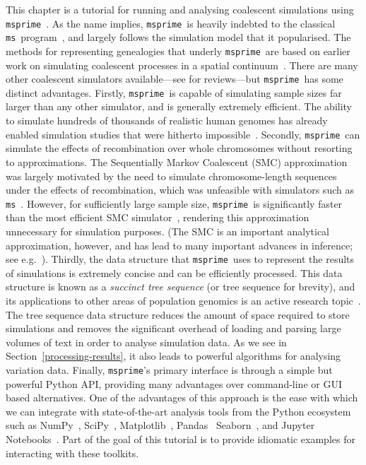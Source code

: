 \documentclass[graybox]{svmult}
\newcommand{\msprime}[0]{\texttt{msprime}}
\newcommand{\ms}[0]{\texttt{ms}}
\begin{document}
This chapter is a tutorial for running and analysing coalescent simulations
using \msprime~\citep{kelleher2016efficient}.
As the name implies, \msprime\ is heavily indebted to the classical
\ms\ program~\citep{hudson2002generating}, and largely follows the
simulation model that it popularised. The methods for representing
genealogies that underly \msprime\ are based on earlier work on simulating coalescent
processes in a spatial
continuum~\citep{kelleher2013coalescent,kelleher2014coalescent}.
There are many other coalescent simulators available---see
\citep{carvajal2008simulation,liu2008survey,arenas2012simulation,
yuan2012overview,hoban2012computer} for reviews---but \msprime\ has
some distinct advantages. Firstly, \msprime\ is capable of simulating
sample sizes far larger than any other simulator, and is generally
extremely efficient. The ability to simulate
hundreds of thousands of realistic human genomes has already enabled simulation studies that were hitherto impossible~\citep{martin2017human}.
Secondly, \msprime\ can simulate the effects of recombination over
whole chromosomes without resorting to approximations. The
Sequentially Markov Coalescent (SMC)
approximation~\citep{mcvean2005approximating} was largely motivated by the
need to simulate chromosome-length sequences under the effects of
recombination,
which was unfeasible with simulators such as \ms~\citep{hudson2002generating}.
However, for sufficiently large sample size, \msprime\ is significantly
faster than the most efficient SMC simulator~\citep{staab2014scrm},
rendering this approximation unnecessary for simulation
purposes\citep{kelleher2016efficient}.
(The SMC is an important analytical approximation, however, and has lead to many important advances in inference; see e.g.~\citep{
li2011inference,
harris2013inferring,
schiffels2014inferring,
rasmussen2014genome}). Thirdly, the data structure that \msprime\ uses
to represent the results of simulations is extremely concise and
can be efficiently processed. This data structure is known as a
\emph{succinct tree sequence} (or tree sequence for brevity),
and its applications to other areas
of population genomics is an active research
topic~\citep{kelleher2018efficient}. The tree sequence data
structure reduces the amount of space
required to store simulations and removes the significant
overhead of loading and parsing large volumes of text in order to analyse
simulation data. As we see in Section~\ref{processing-results}, it also
leads to powerful algorithms for analysing variation data. Finally,
\msprime's primary interface is through a simple but powerful Python
API, providing many advantages over command-line or GUI based alternatives.
One of the advantages of this approach is the ease with which we
can integrate with state-of-the-art analysis tools from the Python
ecosystem such as NumPy~\citep{walt2011numpy}, SciPy~\citep{jones-2018-scipy},
Matplotlib~\citep{hunter2007matplotlib}, Pandas~\citep{mckinney2010data}
Seaborn~\citep{michael_waskom_2017_883859}, and
Jupyter Notebooks~\citep{perez2007ipython}. Part of the goal
of this tutorial is to provide idiomatic examples for interacting
with these toolkits.
\end{document}
